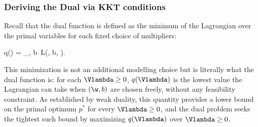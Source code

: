 %
%
%
%
%
%
%
%
%
%
%


\subsubsection*{Deriving the Dual via KKT conditions}

Recall that the dual function is defined as the minimum of the Lagrangian over the primal
variables for each fixed choice of multipliers:
\begin{myequation*}
q(\Vlambda) \;=\; \min_{\w, b}\, L(\w, b, \Vlambda).
\end{myequation*}
This minimization is not an additional modelling choice but is literally what the dual
function is: for each $\Vlambda \ge 0$, $q(\Vlambda)$ is the lowest value the Lagrangian
can take when $(\w, b)$ are chosen freely, without any feasibility constraint. As
established by weak duality, this quantity provides a lower bound on the primal optimum
$p^*$ for every $\Vlambda \ge 0$, and the dual problem seeks the tightest such bound by
maximizing $q(\Vlambda)$ over $\Vlambda \ge 0$.

